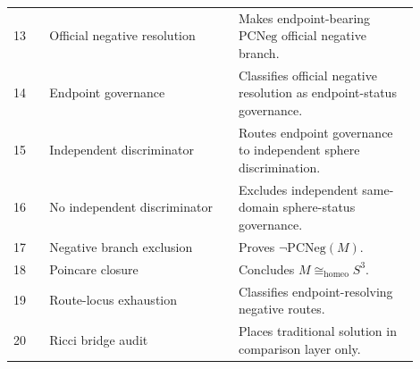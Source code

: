 \documentclass[11pt]{article}
\newcommand{\Sthree}{S^{3}}
\newcommand{\PCNeg}{\mathrm{PCNeg}}
\newcommand{\Homeo}{\cong_{\mathrm{homeo}}}
\begin{document}
\begin{longtable}{L{0.08\linewidth}L{0.42\linewidth}L{0.40\linewidth}}
13 & Official negative resolution & Makes endpoint-bearing \(\PCNeg\) official negative branch.\\
14 & Endpoint governance & Classifies official negative resolution as endpoint-status governance.\\
15 & Independent discriminator & Routes endpoint governance to independent sphere discrimination.\\
16 & No independent discriminator & Excludes independent same-domain sphere-status governance.\\
17 & Negative branch exclusion & Proves \(\neg\PCNeg(M)\).\\
18 & Poincare closure & Concludes \(M\Homeo\Sthree\).\\
19 & Route-locus exhaustion & Classifies endpoint-resolving negative routes.\\
20 & Ricci bridge audit & Places traditional solution in comparison layer only.\\
\bottomrule
\end{longtable}
\end{document}
